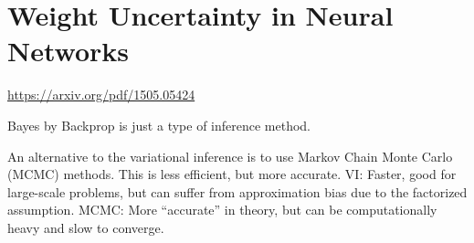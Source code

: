 \section{Weight Uncertainty in Neural Networks}
\url{https://arxiv.org/pdf/1505.05424}

Bayes by Backprop is just a type of inference method.

An alternative to the variational inference is to use Markov Chain Monte Carlo (MCMC) methods. This is less efficient, but more accurate. 
VI: Faster, good for large-scale problems, but can suffer from approximation bias due to the factorized assumption.
MCMC: More “accurate” in theory, but can be computationally heavy and slow to converge.
